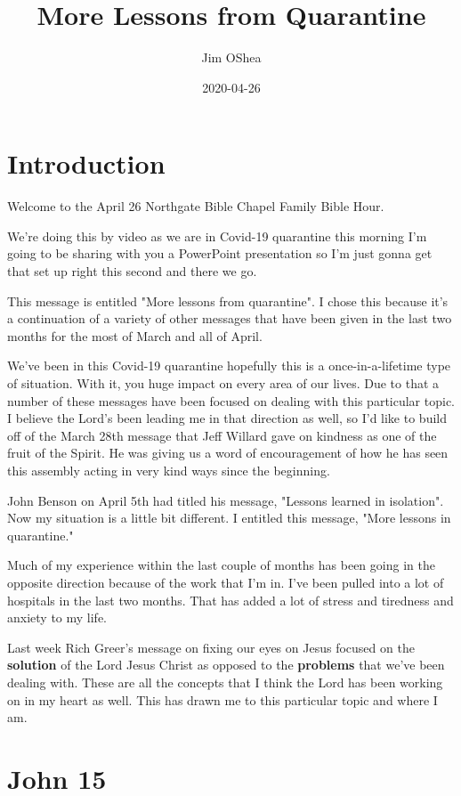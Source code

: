 \documentclass[11pt]{article} %
\title{More Lessons from Quarantine}
\author{Jim OShea}
\date{2020-04-26} %
\begin{document}
\maketitle

\section{Introduction}

Welcome to the April 26 Northgate Bible Chapel Family Bible Hour.

We're doing this by video as we are in Covid-19 quarantine this morning I'm going to be sharing with
you a PowerPoint presentation so I'm just gonna get that set up right this second and there we go.

This message is entitled "More lessons from quarantine". I chose this because it's a continuation of a
variety of other messages that have been given in the last two months for the most of March and all of April.

We've been in this Covid-19 quarantine hopefully this is a once-in-a-lifetime type of situation.  With it,
you huge impact on every area of our lives.  Due to that a number of these messages have been focused
on dealing with this particular topic. I believe the Lord's been leading me in that direction as well, so I'd
like to build off of the March 28th message that Jeff Willard gave on kindness as one of the fruit of the Spirit. 
He was giving us a word of encouragement of how he has seen this assembly acting in very kind ways since
the beginning.

John Benson on April 5th had titled his message, "Lessons learned in isolation".  Now my situation is a little bit
different. I entitled this message, "More lessons in quarantine."

Much of my experience within the last couple of months has been going in the opposite direction because of the
work that I'm in. I've been pulled into a lot of hospitals in the last two months. That has added a lot of stress and
tiredness and anxiety to my life.

Last week Rich Greer's message on fixing our eyes on Jesus focused on the \textbf{solution} of the Lord Jesus Christ
as opposed to the \textbf{problems} that we've been dealing with. These are all the concepts that I think the Lord has
been working on in my heart as well. This has drawn me to this particular topic and where I am.

\section{John 15}
\end{document}
